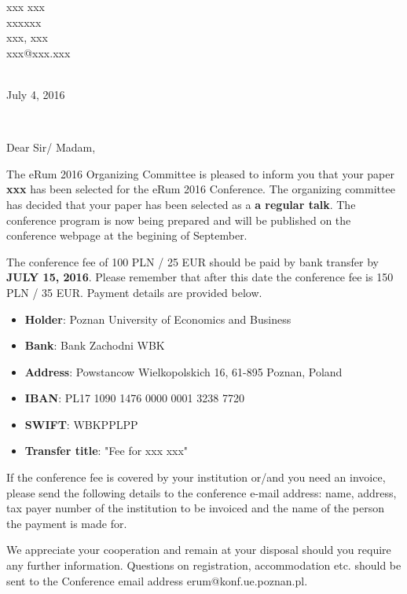 \documentclass[10pt,a4paper]{letter}\usepackage[]{graphicx}\usepackage[]{color}
\def\opening#1{\thispagestyle{empty}
{\centering\fromaddress \vspace{0.6in} \\ %
\hspace*{\longindentation}July 4, 2016\hspace*{\fill}\par} %
{\raggedright \toname \\ \toaddress \par} %
\vspace{0.3in} %
\noindent #1 %
}
\begin{document}

\begin{letter} 
{xxx xxx\\ 
xxxxxx \\
xxx, xxx \\ 
xxx@xxx.xxx \\ 
}


\opening{Dear Sir/ Madam,}

The eRum 2016 Organizing Committee is pleased to inform you that your paper \textbf{xxx} has been selected for the eRum 2016 Conference. The organizing committee has decided that your paper has been selected as a \textbf{a regular talk}. The conference program is now being prepared and will be published on the conference webpage at the begining of September. 

\noindent The conference fee of 100 PLN / 25 EUR should be paid by bank transfer by \textbf{JULY 15, 2016}. Please remember that after this date the conference fee is 150 PLN / 35 EUR. Payment details are provided below.

\begin{itemize}
\itemsep0pt
\item \textbf{Holder}: Poznan University of Economics and Business 
\item \textbf{Bank}: Bank Zachodni WBK 
\item \textbf{Address}: Powstancow Wielkopolskich 16, 61-895 Poznan, Poland 
\item \textbf{IBAN}: PL17 1090 1476 0000 0001 3238 7720 
\item \textbf{SWIFT}: WBKPPLPP 
\item \textbf{Transfer title}: "Fee for xxx xxx"
\end{itemize}

If the conference fee is covered by your institution or/and you need an invoice, please send the following details to the conference e-mail address: name, address, tax payer number of the institution to be invoiced and the name of the person the payment is made for. 

We appreciate your cooperation and remain at your disposal should you require any further information. Questions on registration, accommodation etc. should be sent to the Conference email address erum@konf.ue.poznan.pl. 


\end{letter}
\end{document}
